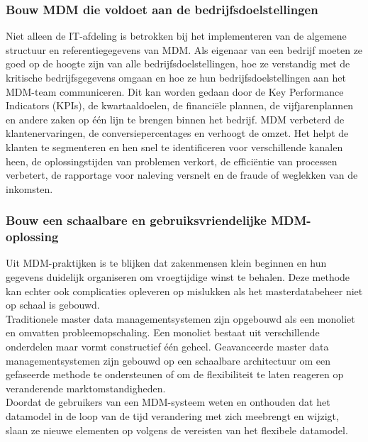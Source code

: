 \subsubsection{Bouw MDM die voldoet aan de bedrijfsdoelstellingen}
Niet alleen de IT-afdeling is betrokken bij het implementeren van de algemene structuur en referentiegegevens van MDM. Als eigenaar van een bedrijf moeten ze goed op de hoogte zijn van alle bedrijfsdoelstellingen, hoe ze verstandig met de kritische bedrijfsgegevens omgaan en hoe ze hun bedrijfsdoelstellingen aan het MDM-team communiceren. Dit kan worden gedaan door de Key Performance Indicators (KPIs), de kwartaaldoelen, de financiële plannen, de vijfjarenplannen en andere zaken op één lijn te brengen binnen het bedrijf. MDM verbeterd de klantenervaringen, de conversiepercentages en verhoogt de omzet. Het helpt de klanten te segmenteren en hen snel te identificeren voor verschillende kanalen heen, de oplossingstijden van problemen verkort, de efficiëntie van processen verbetert, de rapportage voor naleving versnelt en de fraude of weglekken van de inkomsten.

\subsubsection{Bouw een schaalbare en gebruiksvriendelijke MDM-oplossing}
Uit MDM-praktijken is te blijken dat zakenmensen klein beginnen en hun gegevens duidelijk organiseren om vroegtijdige winst te behalen. Deze methode kan echter ook complicaties opleveren op mislukken als het masterdatabeheer niet op schaal is gebouwd.
\\Traditionele master data managementsystemen zijn opgebouwd als een monoliet en omvatten probleemopschaling. Een monoliet bestaat uit verschillende onderdelen maar vormt constructief één geheel. Geavanceerde master data managementsystemen zijn gebouwd op een schaalbare architectuur om een gefaseerde methode te ondersteunen of om de flexibiliteit te laten reageren op veranderende marktomstandigheden. 
\\Doordat de gebruikers van een MDM-systeem weten en onthouden dat het datamodel in de loop van de tijd verandering met zich meebrengt en wijzigt, slaan ze nieuwe elementen op volgens de vereisten van het flexibele datamodel.


